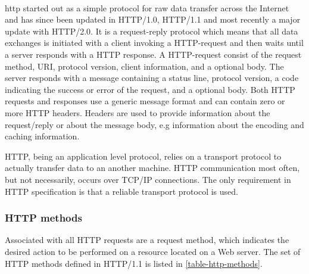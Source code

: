 \paragraph{}

\gls{http} started out as a simple protocol for raw data transfer across the
Internet and has since been updated in HTTP/1.0, HTTP/1.1 and most recently a
major update with HTTP/2.0. It is a request-reply protocol which means that all
data exchanges is initiated with a client invoking a HTTP-request and then waits
until a server responds with a HTTP response. A HTTP-request consist of the
request method, URI, protocol version, client information, and a optional body.
The server responds with a message containing a status line, protocol version, a
code indicating the success or error of the request, and a optional body. Both
HTTP requests and responses use a generic message format and can contain zero or
more HTTP headers. Headers are used to provide information about the
request/reply or about the message body, e.g information about the encoding and
caching information.

HTTP, being an application level protocol, relies on a transport protocol to
actually transfer data to an another machine. HTTP communication most often, but
not necessarily, occurs over TCP/IP connections. The only requirement in HTTP
specification is that a reliable transport protocol is used.

\subsubsection{HTTP methods}

 Associated with all HTTP requests are a request method, which indicates the
 desired action to be performed on a resource located on a Web server. The set
 of HTTP methods defined in HTTP/1.1 is listed in \cref{table-http-methods}.

